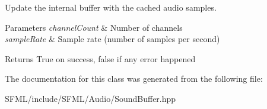 Update the internal buffer with the cached audio samples. 


\begin{DoxyParams}{Parameters}
{\em channel\+Count} & Number of channels \\
\hline
{\em sample\+Rate} & Sample rate (number of samples per second)\\
\hline
\end{DoxyParams}
\begin{DoxyReturn}{Returns}
True on success, false if any error happened \begin{DoxyVerb}\end{DoxyVerb}
 
\end{DoxyReturn}


The documentation for this class was generated from the following file\+:\begin{DoxyCompactItemize}
\item 
S\+F\+M\+L/include/\+S\+F\+M\+L/\+Audio/Sound\+Buffer.\+hpp\end{DoxyCompactItemize}
